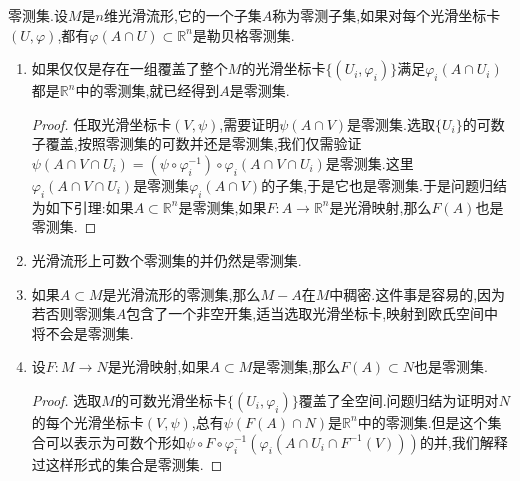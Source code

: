 零测集.设$M$是$n$维光滑流形,它的一个子集$A$称为零测子集,如果对每个光滑坐标卡$(U,\varphi)$,都有$\varphi(A\cap U)\subset\mathbb{R}^n$是勒贝格零测集.
\begin{enumerate}
	\item 如果仅仅是存在一组覆盖了整个$M$的光滑坐标卡$\{(U_i,\varphi_i)\}$满足$\varphi_i(A\cap U_i)$都是$\mathbb{R}^n$中的零测集,就已经得到$A$是零测集.
	\begin{proof}
		
		任取光滑坐标卡$(V,\psi)$,需要证明$\psi(A\cap V)$是零测集.选取$\{U_i\}$的可数子覆盖,按照零测集的可数并还是零测集,我们仅需验证$\psi(A\cap V\cap U_i)=(\psi\circ\varphi_i^{-1})\circ\varphi_i(A\cap V\cap U_i)$是零测集.这里$\varphi_i(A\cap V\cap U_i)$是零测集$\varphi_i(A\cap V)$的子集,于是它也是零测集.于是问题归结为如下引理:如果$A\subset\mathbb{R}^n$是零测集,如果$F:A\to\mathbb{R}^n$是光滑映射,那么$F(A)$也是零测集.
	\end{proof}
    \item 光滑流形上可数个零测集的并仍然是零测集.
    \item 如果$A\subset M$是光滑流形的零测集,那么$M-A$在$M$中稠密.这件事是容易的,因为若否则零测集$A$包含了一个非空开集,适当选取光滑坐标卡,映射到欧氏空间中将不会是零测集.
    \item 设$F:M\to N$是光滑映射,如果$A\subset M$是零测集,那么$F(A)\subset N$也是零测集.
    \begin{proof}
    	
    	选取$M$的可数光滑坐标卡$\{(U_i,\varphi_i)\}$覆盖了全空间.问题归结为证明对$N$的每个光滑坐标卡$(V,\psi)$,总有$\psi(F(A)\cap N)$是$\mathbb{R}^n$中的零测集.但是这个集合可以表示为可数个形如$\psi\circ F\circ\varphi_i^{-1}(\varphi_i(A\cap U_i\cap F^{-1}(V)))$的并,我们解释过这样形式的集合是零测集.
    \end{proof}
\end{enumerate}

